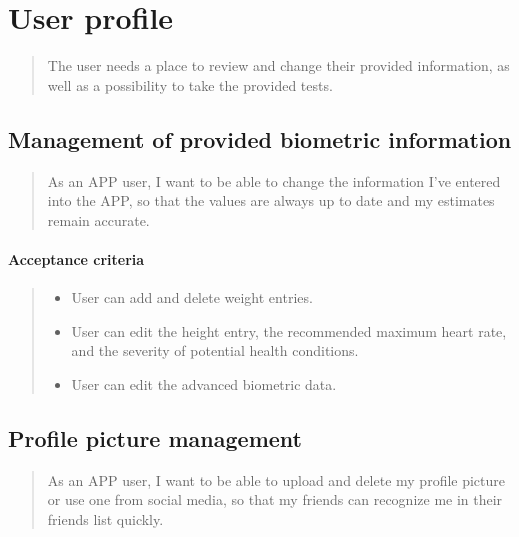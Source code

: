 
\section{User profile}\label{epic:user}
\begin{quote}
The user needs a place to review and change their provided information, as well as a possibility to take the provided tests.
\end{quote}

\subsection{Management of provided biometric information}\label{US:user-manage-info}
\begin{quote}
As an APP user, I want to be able to change the information I've entered into the APP, so that the values are always up to date and my estimates remain accurate.
\end{quote}

\paragraph*{Acceptance criteria}
\begin{quote}
\begin{itemize}
    \item User can add and delete weight entries.
    \item User can edit the height entry, the recommended maximum heart rate, and the severity of potential health conditions.
    \item User can edit the advanced biometric data.
\end{itemize}
\end{quote}

\subsection{Profile picture management}\label{US:user-manage-pic}
\begin{quote}
As an APP user, I want to be able to upload and delete my profile picture or use one from social media, so that my friends can recognize me in their friends list quickly.
\end{quote}

